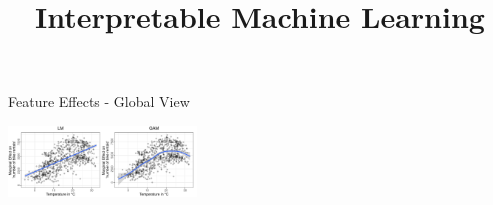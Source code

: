 \documentclass[11pt,compress,t,notes=noshow, aspectratio=169, xcolor=table]{beamer}
\title{Interpretable Machine Learning}
\date{}
\begin{document}
\newcommand{\titlefigure}{figure/feature-effect}
\newcommand{\learninggoals}{
\item Intro to feature effects
\item ICE plots
}


\begin{frame}{Feature Effects - Global View}





\centering

\includegraphics[width=0.375\textwidth, trim=0cm 0.1cm 10.4cm 0cm, clip]{figure/lm_main_effects}


\end{frame}
\end{document}
